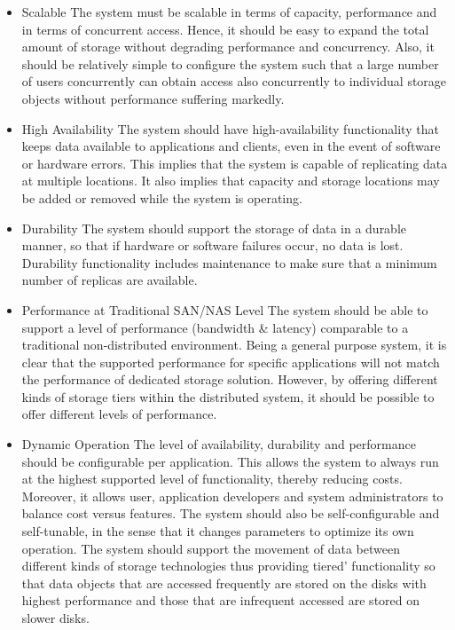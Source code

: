\documentclass[11pt]{article}
\begin{document}
\begin{itemize}
\item Scalable The system must be scalable in terms of capacity, performance 
and in terms of concurrent access. Hence, it should be easy to expand the 
total amount of storage without degrading performance and concurrency. Also, 
it should be relatively simple to configure the system such that a large 
number of users concurrently can obtain access also concurrently to 
individual storage objects without performance suffering markedly.

\item High Availability The system should have high-availability functionality 
that keeps data available to applications and clients, even in the event of 
software or hardware errors. This implies that the system is capable of 
replicating data at multiple locations. It also implies that capacity and 
storage locations may be added or removed while the system is operating.
\item Durability The system should support the storage of data in a durable 
manner, so that if hardware or software failures occur, no data is lost. 
Durability functionality includes maintenance to make sure that a minimum 
number of replicas are available. 

\item Performance at Traditional SAN/NAS Level The system should be able to 
support a level of performance (bandwidth \& latency) comparable to a 
traditional non-distributed environment. Being a general purpose system, 
it is clear that the supported performance for specific applications will 
not match the performance of dedicated storage solution. However, by 
offering different kinds of storage tiers within the distributed system, 
it should be possible to offer different levels of performance. 

\item Dynamic Operation The level of availability, durability and performance 
should be configurable per application. This allows the system to always 
run at the highest supported level of functionality, thereby reducing costs. 
Moreover, it allows user, application developers and system administrators 
to balance cost versus features. The system should also be self-configurable 
and self-tunable, in the sense that it changes parameters to optimize its 
own operation. The system should support the movement of  data between 
different kinds of storage technologies thus providing tiered’ 
functionality so that data objects that are accessed frequently are 
stored on the disks with highest performance and those that are infrequent 
accessed are stored on slower disks. 


\end{itemize}
\end{document}
